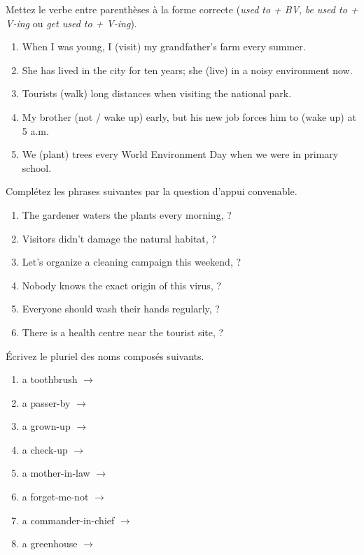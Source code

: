 \documentclass[11pt]{article}
\begin{document}
\begin{exercice}
Mettez le verbe entre parenthèses à la forme correcte (\textit{used to + BV}, \textit{be used to + V-ing} ou \textit{get used to + V-ing}).
\begin{enumerate}
    \item When I was young, I \dotfill (visit) my grandfather's farm every summer.
    \item She has lived in the city for ten years; she \dotfill (live) in a noisy environment now.
    \item Tourists \dotfill (walk) long distances when visiting the national park.
    \item My brother \dotfill (not / wake up) early, but his new job forces him to \dotfill (wake up) at 5 a.m.
    \item We \dotfill (plant) trees every World Environment Day when we were in primary school.
\end{enumerate}
\end{exercice}

\begin{exercice}
Complétez les phrases suivantes par la question d'appui convenable.
\begin{enumerate}
    \item The gardener waters the plants every morning, \dotfill ?
    \item Visitors didn't damage the natural habitat, \dotfill ?
    \item Let's organize a cleaning campaign this weekend, \dotfill ?
    \item Nobody knows the exact origin of this virus, \dotfill ?
    \item Everyone should wash their hands regularly, \dotfill ?
    \item There is a health centre near the tourist site, \dotfill ?
\end{enumerate}
\end{exercice}

\begin{exercice}
Écrivez le pluriel des noms composés suivants.
\begin{enumerate}
    \item a toothbrush $\rightarrow$ \dotfill
    \item a passer-by $\rightarrow$ \dotfill
    \item a grown-up $\rightarrow$ \dotfill
    \item a check-up $\rightarrow$ \dotfill
    \item a mother-in-law $\rightarrow$ \dotfill
    \item a forget-me-not $\rightarrow$ \dotfill
    \item a commander-in-chief $\rightarrow$ \dotfill
    \item a greenhouse $\rightarrow$ \dotfill
\end{enumerate}
\end{exercice}
\end{document}
